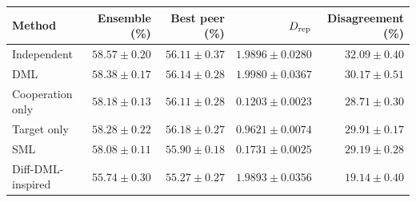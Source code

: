 \begin{tabular}{lrrrr}
\toprule
Method & Ensemble (\%) & Best peer (\%) & $D_{\rm rep}$ & Disagreement (\%) \\
\midrule
Independent & $58.57\pm0.20$ & $56.11\pm0.37$ & $1.9896\pm0.0280$ & $32.09\pm0.40$ \\
DML & $58.38\pm0.17$ & $56.14\pm0.28$ & $1.9980\pm0.0367$ & $30.17\pm0.51$ \\
Cooperation only & $58.18\pm0.13$ & $56.11\pm0.28$ & $0.1203\pm0.0023$ & $28.71\pm0.30$ \\
Target only & $58.28\pm0.22$ & $56.18\pm0.27$ & $0.9621\pm0.0074$ & $29.91\pm0.17$ \\
SML & $58.08\pm0.11$ & $55.90\pm0.18$ & $0.1731\pm0.0025$ & $29.19\pm0.28$ \\
Diff-DML-inspired & $55.74\pm0.30$ & $55.27\pm0.27$ & $1.9893\pm0.0356$ & $19.14\pm0.40$ \\
\bottomrule
\end{tabular}
